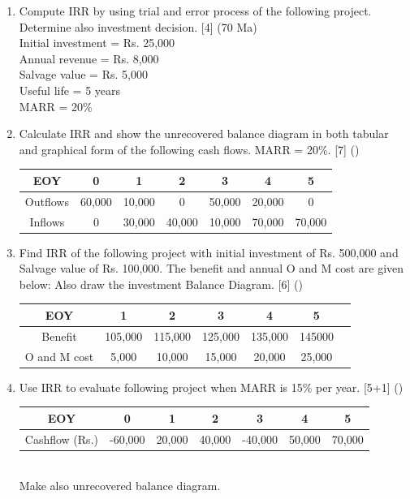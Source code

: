 \documentclass[12pt]{article}
\begin{document}
\begin{enumerate}
				\item Compute IRR by using trial and error process of the following project. Determine also investment decision. \hfill [4] (70 Ma)\\
				Initial investment = Rs. 25,000\\
				Annual revenue = Rs. 8,000\\
				Salvage value = Rs. 5,000\\
				Useful life = 5 years\\
				MARR = 20\%	
				
				\item Calculate IRR and show the unrecovered balance diagram in both tabular and graphical form of the following cash flows. MARR = 20\%. \hfill [7] ()
				\begin{tabular}{|c|c|c|c|c|c|c|}
					\hline
					EOY & 0 & 1 & 2 & 3 & 4 & 5\\ \hline
					Outflows & 60,000 & 10,000 & 0 & 50,000 & 20,000 & 0\\ \hline
					Inflows & 0 & 30,000 & 40,000 & 10,000 & 70,000 & 70,000\\ \hline
				\end{tabular}
				
				\item Find IRR of the following project with initial investment of Rs. 500,000 and Salvage value of Rs. 100,000. The benefit and annual O and M cost are given below: Also draw the investment Balance Diagram. \hfill [6] ()\\
				\begin{tabular}{|c|c|c|c|c|c|c|}
					\hline
					EOY & 1 & 2 & 3 & 4 & 5\\ \hline
					Benefit & 105,000 & 115,000 & 125,000 & 135,000 & 145000 \\ \hline
					O and M cost & 5,000 & 10,000 & 15,000 & 20,000 & 25,000 \\ \hline
				\end{tabular}
				
				\item Use IRR to evaluate following project when MARR is 15\% per year. \hfill [5+1] ()\\
				\begin{tabular}{|c|c|c|c|c|c|c|}
					\hline
					EOY & 0 & 1 & 2 & 3 & 4 & 5\\ \hline
					Cashflow (Rs.) & -60,000 & 20,000 & 40,000 & -40,000 & 50,000 & 70,000\\ \hline
				\end{tabular}\\
				Make also unrecovered balance diagram.
				

\end{enumerate}
\end{document}
